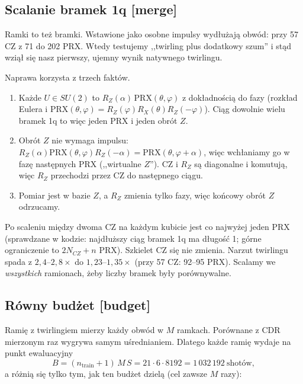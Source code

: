 \documentclass[11pt,a4paper]{article}
\newcommand{\slid}[1]{\hfill{\normalfont\small\ttfamily\color{axbluedk}[#1]}}
\newcommand{\PRX}{\mathrm{PRX}}
\begin{document}
\subsection{Scalanie bramek 1q \slid{merge}}

Ramki to też bramki. Wstawione jako osobne impulsy wydłużają obwód: przy 57 CZ z 71 do 202 PRX.
Wtedy testujemy ,,twirling plus dodatkowy szum'' i stąd wziął się nasz pierwszy, ujemny wynik
natywnego twirlingu.

Naprawa korzysta z trzech faktów.
\begin{enumerate}
  \item Każde $U\in SU(2)$ to $R_Z(\alpha)\,\PRX(\theta,\varphi)$ z dokładnością do fazy (rozkład
  Eulera i $\PRX(\theta,\varphi)=R_Z(\varphi)R_X(\theta)R_Z(-\varphi)$). Ciąg dowolnie wielu
  bramek 1q to więc jeden PRX i jeden obrót $Z$.
  \item Obrót $Z$ nie wymaga impulsu: $R_Z(\alpha)\PRX(\theta,\varphi)R_Z(-\alpha)=\PRX(\theta,\varphi+\alpha)$,
  więc wchłaniamy go w fazę następnych PRX (,,wirtualne $Z$''). CZ i $R_Z$ są diagonalne i
  komutują, więc $R_Z$ przechodzi przez CZ do następnego ciągu.
  \item Pomiar jest w bazie $Z$, a $R_Z$ zmienia tylko fazy, więc końcowy obrót $Z$ odrzucamy.
\end{enumerate}
Po scaleniu między dwoma CZ na każdym kubicie jest co najwyżej jeden PRX (sprawdzane w kodzie:
najdłuższy ciąg bramek 1q ma długość 1; górne ograniczenie to $2N_{CZ}+n$ PRX). Szkielet CZ się
nie zmienia. Narzut twirlingu spada z $2{,}4$--$2{,}8\times$ do $1{,}23$--$1{,}35\times$ (przy 57
CZ: 92--95 PRX). Scalamy we \emph{wszystkich} ramionach, żeby liczby bramek były porównywalne.

\subsection{Równy budżet \slid{budget}}

Ramię z twirlingiem mierzy każdy obwód w $M$ ramkach. Porównane z CDR mierzonym raz wygrywa samym
uśrednianiem. Dlatego każde ramię wydaje na punkt ewaluacyjny
\[
  B=(n_{\text{train}}+1)\,M\,S=21\cdot6\cdot8192=1\,032\,192\ \text{shotów},
\]
a różnią się tylko tym, jak ten budżet dzielą (cel zawsze $M$ razy):
\end{document}
